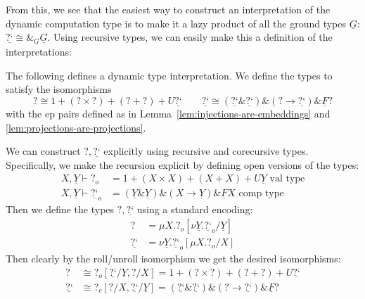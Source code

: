 \documentclass[acmsmall,nonacm]{acmart}
\renewcommand{\u}{\underline}
\newcommand{\vtype}{\,\,\text{val type}}
\newcommand{\ctype}{\,\,\text{comp type}}
\newcommand{\dynv}{{?}}
\newcommand{\dync}{\u {\text{?`}}}
\newcommand{\with}{\mathbin{\&}}
\DeclareMathOperator*{\With}{\&}
\begin{document}
From this, we see that the easiest way to construct an interpretation
of the dynamic computation type is to make it a lazy product of all
the ground types $\u G$: $\dync \cong \With_{\u G} \u G$.
%
Using recursive types, we can easily make this a definition of the
interpretations:

\begin{definition}
  \label{def:natural-type-interp}
  The following defines a dynamic type interpretation.
  We define the types to satisfy the isomorphisms
  \[
    \dynv \cong 1 + (\dynv \times \dynv) + (\dynv + \dynv) + U\dync \qquad
    \dync \cong (\dync \with \dync) \with (\dynv \to \dync) \with \u F \dynv
  \]
  with the ep pairs defined as in
  Lemma~\ref{lem:injections-are-embeddings} and
  \ref{lem:projections-are-projections}.  
\end{definition}
\begin{longproof}
  We can construct $\dynv, \dync$ explicitly using recursive and
  corecursive types. Specifically, we make the recursion explicit by
  defining open versions of the types:
  \begin{align*}
    X,\u Y \vdash \dynv_o &= 1 + (X \times X) + (X + X) + U\u Y\vtype \\
    X,\u Y \vdash \dync_o &= (\u Y \with \u Y) \with (X \to \u Y) \with \u F X \ctype
  \end{align*}
  Then we define the types $\dynv, \dync$ using a standard encoding:
  \begin{align*}
    \dynv &= \mu X. \dynv_o[\nu \u Y. \dync_o/\u Y]\\
    \dync &= \nu \u Y. \dync_o[\mu X. \dynv_o/X]
  \end{align*}
  Then clearly by the roll/unroll isomorphism we get the desired
  isomorphisms:
  \begin{align*}
    \dynv &\cong \dynv_o[\dync/\u Y,\dynv/X] = 1 + (\dynv \times \dynv) + (\dynv + \dynv) + U\dync \\
    \dync &\cong\dynv_c[\dynv/X,\dync/\u Y] = (\dync \with \dync) \with (\dynv \to \dync) \with \u F \dynv
  \end{align*}
\end{longproof}
\end{document}
